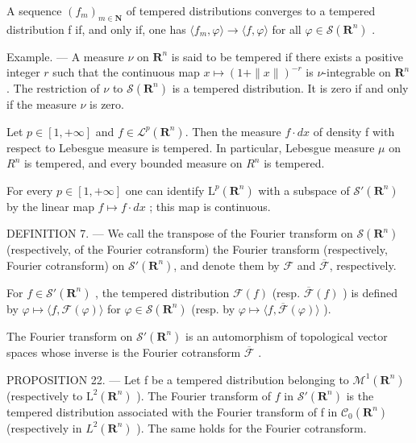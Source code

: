 A sequence \((f_{m})_{m\in\mathbf{N}}\) of tempered distributions converges to a tempered distribution f if, and only if, one has \(\langle f_{m},\varphi\rangle\to\langle f,\varphi\rangle\) for all \(\varphi\in\mathcal{S}(\mathbf{R}^{n})\) .

Example. --- A measure \(\nu\) on \(\mathbf{R}^n\) is said to be tempered if there exists a positive integer \(r\) such that the continuous map \(x \mapsto (1 + \|x\|)^{-r}\) is \(\nu\)-integrable on \(\mathbf{R}^n\). The restriction of \(\nu\) to \(\mathcal{S}(\mathbf{R}^n)\) is a tempered distribution. It is zero if and only if the measure \(\nu\) is zero.

Let \(p \in [1, +\infty]\) and \(f \in \mathcal{L}^{p}(\mathbf{R}^{n})\). Then the measure \(f \cdot dx\) of density f with respect to Lebesgue measure is tempered. In particular, Lebesgue measure \(\mu\) on \(R^{n}\) is tempered, and every bounded measure on \(R^{n}\) is tempered.

For every \(p \in [1, +\infty]\) one can identify \(\mathrm{L}^{p}(\mathbf{R}^{n})\) with a subspace of \(\mathcal{S}'(\mathbf{R}^{n})\) by the linear map \(f \mapsto f \cdot dx\) ; this map is continuous.

DEFINITION 7. --- We call the transpose of the Fourier transform on \(\mathcal{S}(\mathbf{R}^n)\) (respectively, of the Fourier cotransform) the Fourier transform (respectively, Fourier cotransform) on \(\mathcal{S}'(\mathbf{R}^n)\), and denote them by \(\mathcal{F}\) and \(\overline{\mathcal{F}}\), respectively.

For \(f \in \mathcal{S}'(\mathbf{R}^n)\) , the tempered distribution \(\mathcal{F}(f)\) (resp. \(\overline{\mathcal{F}}(f)\) ) is defined by \(\varphi \mapsto \langle f, \mathcal{F}(\varphi) \rangle\) for \(\varphi \in \mathcal{S}(\mathbf{R}^n)\) (resp. by \(\varphi \mapsto \langle f, \overline{\mathcal{F}}(\varphi) \rangle\) ).

The Fourier transform on \(\mathcal{S}'(\mathbf{R}^n)\) is an automorphism of topological vector spaces whose inverse is the Fourier cotransform \(\overline{\mathcal{F}}\) .

PROPOSITION 22. --- Let f be a tempered distribution belonging to \(\mathcal{M}^{1}(\mathbf{R}^{n})\) (respectively to \(\mathrm{L}^{2}(\mathbf{R}^{n})\) ). The Fourier transform of \(f\) in \(\mathcal{S}'(\mathbf{R}^{n})\) is the tempered distribution associated with the Fourier transform of f in \(\mathcal{C}_{0}(\mathbf{R}^{n})\) (respectively in \(L^{2}(\mathbf{R}^{n})\) ). The same holds for the Fourier cotransform.

